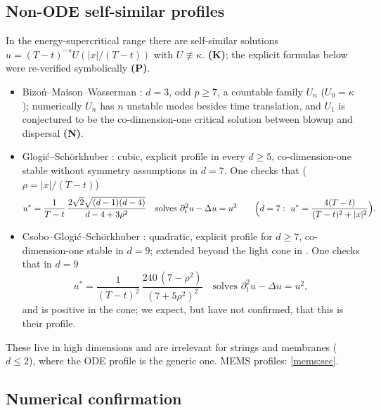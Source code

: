 \subsection{Non-ODE self-similar profiles}
\label{power:subsec-nontrivial}

In the energy-supercritical range there are self-similar solutions
$u=(T-t)^{-s}U(|x|/(T-t))$ with $U\not\equiv\kappa$. \textbf{(K)}; the explicit
formulas below were re-verified symbolically \textbf{(P)}.
\begin{itemize}[leftmargin=1.2em,nosep]
\item Bizoń--Maison--Wasserman \cite{BizonMaisonWasserman2007}: $d=3$, odd $p\ge7$,
  a countable family $U_n$ ($U_0=\kappa$); numerically $U_n$ has $n$ unstable modes
  besides time translation, and $U_1$ is conjectured to be the
  co-dimension-one critical solution between blowup and dispersal \textbf{(N)}.
\item Glogić--Schörkhuber \cite{GlogicSchoerkhuber2021}: cubic, explicit profile
  in every $d\ge5$, co-dimension-one stable without symmetry assumptions in
  $d=7$. One checks that ($\rho=|x|/(T-t)$)
  \[
    u^*=\frac{1}{T-t}\,\frac{2\sqrt2\sqrt{(d-1)(d-4)}}{d-4+3\rho^2}\quad\text{solves }\partial_t^2u-\Delta u=u^3
    \qquad\Bigl(d=7:\ u^*=\frac{4(T-t)}{(T-t)^2+|x|^2}\Bigr).
  \]
\item Csobo--Glogić--Schörkhuber \cite{CsoboGlogicSchoerkhuber2024}: quadratic,
  explicit profile for $d\ge7$, co-dimension-one stable in $d=9$; extended beyond
  the light cone in \cite{ChenEtAl2024}. One checks that in $d=9$
  \[
    u^*=\frac{1}{(T-t)^2}\,\frac{240\,(7-\rho^2)}{(7+5\rho^2)^2}\quad\text{solves }\partial_t^2u-\Delta u=u^2,
  \]
  and is positive in the cone; we expect, but have not confirmed, that this is
  their profile.
\end{itemize}
These live in high dimensions and are irrelevant for strings and membranes
($d\le2$), where the ODE profile is the generic one. MEMS profiles:
\cref{mems:sec}.

\subsection{Numerical confirmation}
\label{power:subsec-numerics}

